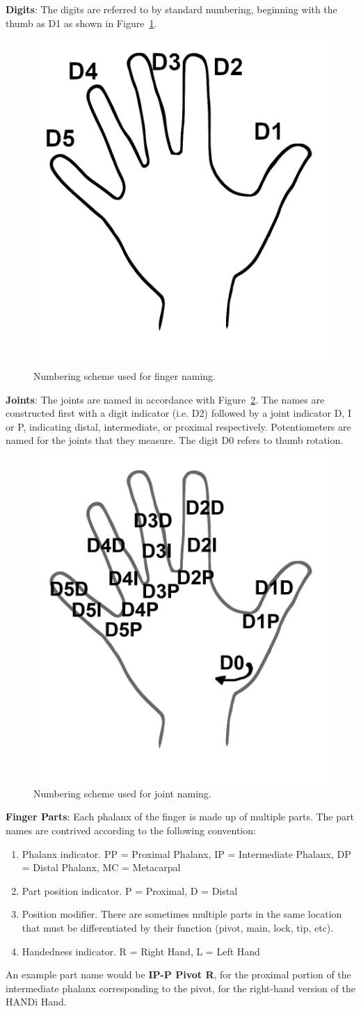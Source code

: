 \documentclass[
11pt, %
oneside, %
english, %
headsepline, %
openany %
]{Manual} %
\begin{document}
\noindent\textbf{Digits}: The digits are referred to by standard numbering, beginning with the thumb as D1 as shown in Figure~\ref{fig:finger_nums}.
\begin{figure}[H]
\centering
\includegraphics[width=0.3\linewidth]{Figures/Finger_Numbering.png}
\caption{Numbering scheme used for finger naming.}
\label{fig:finger_nums}
\end{figure}
\noindent\textbf{Joints}: The joints are named in accordance with Figure~\ref{fig:joint_nums}. The names are constructed first with a digit indicator (i.e. D2) followed by a joint indicator D, I or P, indicating distal, intermediate, or proximal respectively. Potentiometers are named for the joints that they measure. The digit D0 refers to thumb rotation.
\begin{figure}[H]
\centering
\includegraphics[width=0.3\linewidth]{Figures/Joint_Numbering.png}
\caption{Numbering scheme used for joint naming.}
\label{fig:joint_nums}
\end{figure}

\noindent\textbf{Finger Parts}: Each phalanx of the finger is made up of multiple parts. The part names are contrived according to the following convention:
\begin{enumerate}
\item Phalanx indicator. PP = Proximal Phalanx, IP = Intermediate Phalanx, DP = Distal Phalanx, MC = Metacarpal
\item Part position indicator. P = Proximal, D = Distal
\item Position modifier. There are sometimes multiple parts in the same location that must be differentiated by their function (pivot, main, lock, tip, etc).
\item Handedness indicator. R = Right Hand, L = Left Hand
\end{enumerate}
An example part name would be \textbf{IP-P Pivot R}, for the proximal portion of the intermediate phalanx corresponding to the pivot, for the right-hand version of the HANDi Hand.
\newpage
\end{document}
